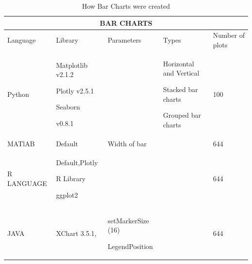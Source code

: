 \documentclass[12pt, a4paper,oneside]{report}
\begin{document}
\begin{table}[h]
	\centering {} \small
	
	\begin{tabular}{|p{3cm}|p{3cm}|p{3cm}|p{3cm}|p{3cm}|}
		
		\hline
		\multicolumn{5}{|c|}{BAR CHARTS} \\
		\hline
		
		Language & Library & Parameters &  Types & Number of plots\\ \hline
		
		Python  & Matplotlib v2.1.2 \par Plotly v2.5.1 \par Seaborn
		
		v0.8.1 &   &
		
		Horizontal and Vertical \par Stacked bar charts \par Grouped bar charts & 100\\ \hline
		
		MATlAB   & Default &  Width of bar &  &  644\\ \hline
		

		R LANGUAGE   & Default,Plotly \par R Library \par ggplot2 &  &   &  644\\ \hline
		
		JAVA   & XChart 3.5.1, & setMarkerSize (16) \par LegendPosition &   &  644\\ \hline
				
	\end{tabular}
	
	\caption {How Bar Charts were created}	\label{Table:1}
\end{table}
\end{document}
